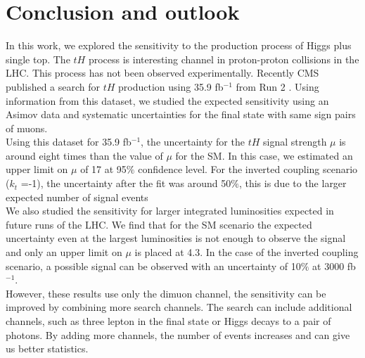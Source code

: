 
\chapter{Conclusion and outlook}
In this work, we explored the sensitivity to the production process of Higgs plus single top.
The $tH$ process is interesting channel in proton-proton collisions in the LHC. This process has not been observed experimentally. Recently CMS published a search for $tH$ production using 35.9 fb$^{-1}$ from Run 2 . Using information from this dataset, we studied the expected sensitivity using an Asimov data and systematic uncertainties for the final state with same sign pairs of muons. \\

Using this dataset for 35.9 fb$^{-1}$, the uncertainty for the $tH$ signal strength $\mu$ is around eight times than the value of $\mu$ for the SM. In this case, we estimated an upper limit on $\mu$ of 17 at 95$\%$ confidence level. 
For the inverted coupling scenario ($k_t$ =-1), the uncertainty after the fit was around 50$\%$, this is due to the larger expected number of signal events
\\	

We also studied the sensitivity for larger integrated luminosities expected in future runs of the LHC. We find that for the SM scenario the expected uncertainty even at the largest luminosities is not enough to observe the signal and only an upper limit on $\mu$ is placed at 4.3. In the case of the inverted coupling scenario, a possible signal can be observed with an uncertainty of 10$\%$ at 3000 fb$^{-1}$.\\

However, these results use only the dimuon channel, the sensitivity can be improved by combining more search channels. The search can include additional channels, such as three lepton in the final state or Higgs decays to a pair of photons. By adding more channels, the number of events increases and can give us better statistics. 




